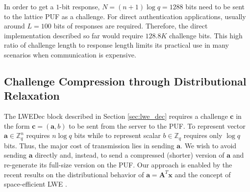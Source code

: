 In order to get a $1$-bit response, $N = (n+1)\log q = 1288$ bits need to be sent to the lattice PUF as a challenge.
For direct authentication applications, usually around $L = 100$ bits of responses are required. Therefore, the direct implementation described so far would require $128.8K$ challenge bits.
This high ratio of challenge length to response length limits its practical use in many scenarios when communication is expensive.



\vspace{-0.5em}
\subsection{Challenge Compression through Distributional Relaxation}
\label{sec:lfsr}
The LWEDec block described in Section \ref{sec:lwe_dec} requires a challenge $\mathbf{c}$ in the form $\mathbf{c}=(\mathbf{a},b)$ to be sent from the server to the PUF. 
To represent vector $\mathbf{a} \in \mathbb{Z}_q^n$ requires $n\log q$ bits while to represent scalar $b \in \mathbb{Z}_q$  requires only $\log q$ bits. 
Thus, the major cost of transmission lies in sending $\mathbf{a}$. 
We wish to avoid sending $\mathbf{a}$ directly and, instead, to send a compressed (shorter) version of $\mathbf{a}$  and re-generate its full-size version on the PUF.
Our approach is enabled by the recent results on the distributional behavior of $\mathbf{a}=\mathbf{A}^T\mathbf{x}$ \cite{akavia2009simultaneous} and the concept of space-efficient LWE \cite{galbraith2013space}.

